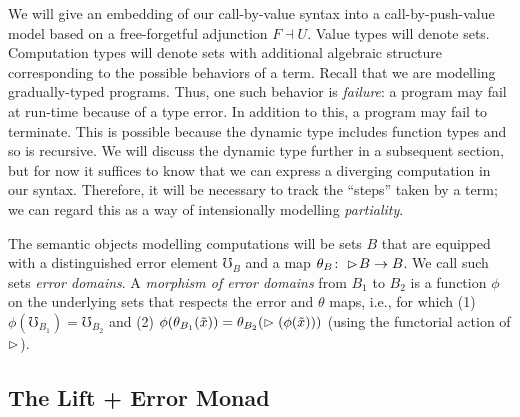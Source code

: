 
We will give an embedding of our call-by-value syntax into a call-by-push-value
model based on a free-forgetful adjunction $F \dashv U$. Value types will denote
sets. Computation types will denote sets with additional algebraic structure
corresponding to the possible behaviors of a term. Recall that we are modelling
gradually-typed programs. Thus, one such behavior is \emph{failure}: a program
may fail at run-time because of a type error. In addition to this, a program may
fail to terminate. This is possible because the dynamic type includes function
types and so is recursive. We will discuss the dynamic type further in a
subsequent section, but for now it suffices to know that we can express a
diverging computation in our syntax. Therefore, it will be necessary to track
the ``steps'' taken by a term; we can regard this as a way of intensionally
modelling \emph{partiality}.

The semantic objects modelling computations will be sets $B$ that are equipped
with a distinguished error element $\mho_B$ and a map $\theta_B \colon \vartriangleright \hspace{-0.2em}
B \to B$. We call such sets \emph{error domains}. A \emph{morphism of error
domains} from $B_1$ to $B_2$ is a function $\phi$ on the underlying sets that
respects the error and $\theta$ maps, i.e., for which 
%
(1) $\phi(\mho_{B_1}) = \mho_{B_2}$ and
%
(2) $\phi(\theta_{B_1}(\tilde{x})) = \theta_{B_2}(\vartriangleright (\phi(\tilde{x})))$
(using the functorial action of $\vartriangleright$).

\subsection{The Lift + Error Monad}\label{sec:lift-monad}


